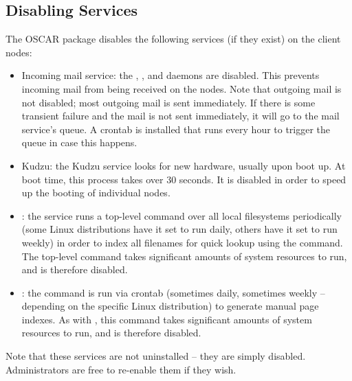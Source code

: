 %
%
% 
% 
% 
% 
%

\subsection{Disabling Services}

The  OSCAR package disables the following
services (if they exist) on the client nodes:

\begin{itemize}
\item Incoming mail service: the , , and
   daemons are disabled.  This prevents incoming mail
  from being received on the nodes.  Note that outgoing mail is not
  disabled; most outgoing mail is sent immediately.  If there is some
  transient failure and the mail is not sent immediately, it will go
  to the mail service's queue.  A  crontab is
  installed that runs every hour to trigger the queue in case this
  happens.

\item Kudzu: the Kudzu service looks for new hardware, usually upon
  boot up.  At boot time, this process takes over 30 seconds.  It is
  disabled in order to speed up the booting of individual nodes.
  
\item {}: the  service runs a top-level
   command over all local filesystems periodically (some
  Linux distributions have it set to run daily, others have it set to
  run weekly) in order to index all filenames for quick lookup using
  the  command.  The top-level  command takes
  significant amounts of system resources to run, and is therefore
  disabled.
  
\item {}: the  command is run via
  crontab (sometimes daily, sometimes weekly -- depending on the
  specific Linux distribution) to generate manual page indexes.  As
  with , this command takes significant amounts of system
  resources to run, and is therefore disabled.
\end{itemize}

Note that these services are not uninstalled -- they are simply
disabled.  Administrators are free to re-enable them if they wish.
